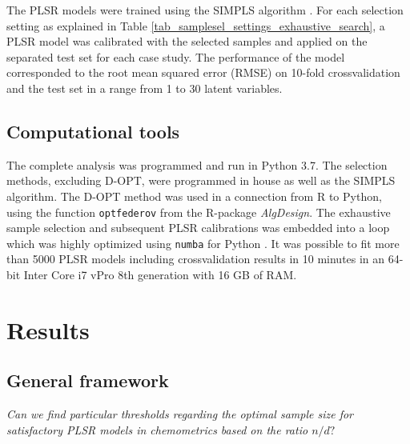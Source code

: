 \documentclass[journal=ancham,manuscript=article]{achemso}
\begin{document}
The PLSR models were trained using the SIMPLS algorithm \cite{DeJong1993}. For each selection setting as explained in Table \ref{tab_samplesel_settings_exhaustive_search}, a PLSR model was calibrated with the selected samples and applied on the separated test set for each case study. The performance of the model corresponded to the root mean squared error (RMSE)  on 10-fold crossvalidation and the test set in a range from 1 to 30 latent variables. 

\subsection*{Computational tools}

The complete analysis was programmed and run in Python 3.7. The selection methods, excluding D-OPT, were programmed in house as well as the SIMPLS algorithm. The D-OPT method was used in a connection from R to Python, using the function \texttt{optfederov} from the R-package \emph{AlgDesign}\cite{Wheeler2019}. The exhaustive sample selection and subsequent PLSR calibrations was embedded into a loop which was highly optimized using \texttt{numba} for Python \cite{Lam2015}. It was possible to fit more than 5000 PLSR models including crossvalidation results in 10 minutes in an 64-bit Inter Core i7 vPro 8th generation with 16 GB of RAM. 



\section*{Results}\label{results}

\subsection*{General framework}\label{results:genframework}

\emph{Can  we  find  particular  thresholds  regarding the optimal sample size for satisfactory PLSR models in chemometrics based on the ratio $n/d?$}
\end{document}
